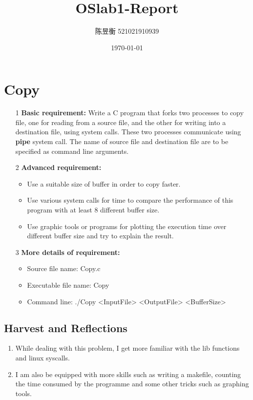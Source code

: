 \documentclass[]{article}
\title{OSlab1-Report}
\author{陈昱衡 521021910939}
\date{\today}
\begin{document}
\maketitle



\section{Copy}
\begin{enumerate}
    \item [1] \textbf{Basic requirement:} Write a C program that forks two processes to copy file, one for reading
    from a source file, and the other for writing into a destination file, using system calls. These two
    processes communicate using \textbf{pipe} system call. The name of source file and destination file are
    to be specified as command line arguments.
    \item [2] \textbf{Advanced requirement:}
        \begin{itemize}
            \item Use a suitable size of buffer in order to copy faster.
            \item Use various system calls for time to compare the performance of this program with at least
            8 different buffer size.
            \item Use graphic tools or programs for plotting the execution time over different buffer size and
            try to explain the result.            
        \end{itemize}
    \item [3] \textbf{More details of requirement:}
        \begin{itemize}
            \item Source file name: Copy.c
            \item Executable file name: Copy
            \item Command line: ./Copy <InputFile> <OutputFile> <BufferSize>
        \end{itemize}
\end{enumerate}
\subsection*{Harvest and Reflections}
\begin{enumerate}
    \item While dealing with this problem, I get more familiar with the lib functions and linux syscalls.
    \item I am also be equipped with more skills such as writing a makefile, counting the time consumed by the programme and some other tricks such as graphing tools.

\end{enumerate}
\end{document}
